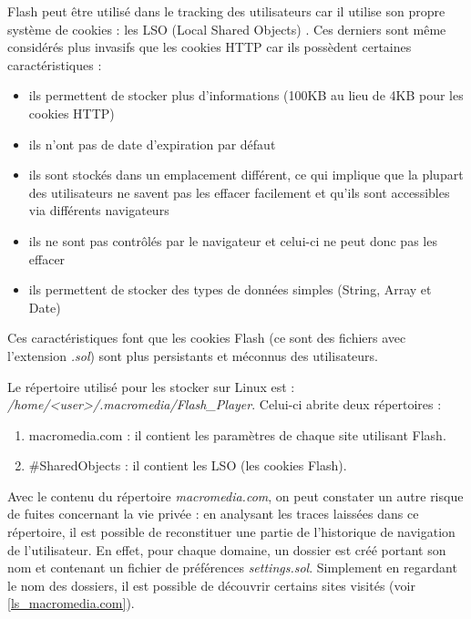 Flash peut être utilisé dans le tracking des utilisateurs car il utilise son propre système de cookies : les LSO (Local Shared Objects) \cite{conf/aaaiss/SoltaniCMTH10}. Ces derniers sont même considérés plus invasifs que les cookies HTTP car ils possèdent certaines caractéristiques \cite{flash_lso} :
\begin{itemize}
  \item ils permettent de stocker plus d'informations (100KB au lieu de 4KB pour les cookies HTTP)
  \item ils n'ont pas de date d'expiration par défaut
  \item ils sont stockés dans un emplacement différent, ce qui implique que la plupart des utilisateurs ne savent pas les effacer facilement et qu'ils sont accessibles via différents navigateurs
  \item ils ne sont pas contrôlés par le navigateur et celui-ci ne peut donc pas les effacer
  \item ils permettent de stocker des types de données simples (String, Array et Date)
  \newline
\end{itemize}

Ces caractéristiques font que les cookies Flash (ce sont des fichiers avec l'extension \textit{.sol}) sont plus persistants et méconnus des utilisateurs.
\newline

Le répertoire utilisé pour les stocker sur Linux est :\\
\mbox{\textit{/home/<user>/.macromedia/Flash\_Player}}. Celui-ci abrite deux répertoires :
\begin{enumerate}
  \item macromedia.com : il contient les paramètres de chaque site utilisant Flash.
  \item \#SharedObjects : il contient les LSO (les cookies Flash).
  \newline
\end{enumerate}

Avec le contenu du répertoire \textit{macromedia.com}, on peut constater un autre risque de fuites concernant la vie privée : en analysant les traces laissées dans ce répertoire, il est possible de reconstituer une partie de l'historique de navigation de l'utilisateur. En effet, pour chaque domaine, un dossier est créé portant son nom et contenant un fichier de préférences \textit{settings.sol}. Simplement en regardant le nom des dossiers, il est possible de découvrir certains sites visités (voir \autoref{ls_macromedia.com}).
\newline


